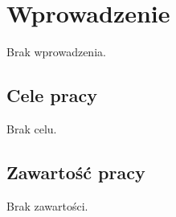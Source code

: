 \chapter{Wprowadzenie}
\label{cha:wprowadzenie}

Brak wprowadzenia.


\section{Cele pracy}
\label{sec:celePracy}

Brak celu.


\section{Zawartość pracy}
\label{sec:zawartoscPracy}

Brak zawartości.


















